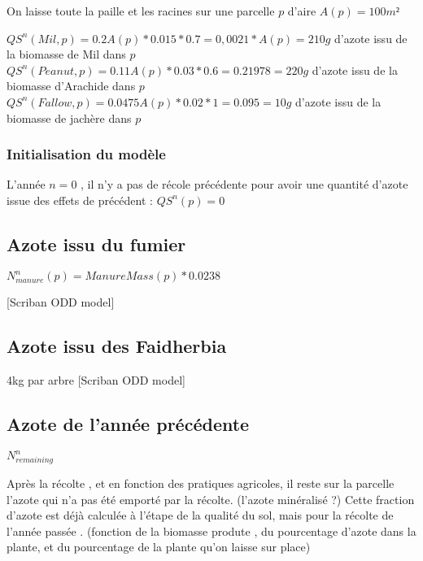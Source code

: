 \documentclass[10pt,a4paper,french]{article} %
\begin{document}
On laisse toute la paille et les racines sur une parcelle $p$ d'aire $A(p)=100m²$


$QS^{n}(Mil, p)= 0.2 A(p)* 0.015 * 0.7 = 0,0021* A(p)= 210g$ d'azote issu de la biomasse de Mil dans $p$ \\
$QS^{n}(Peanut, p)= 0.11 A(p) * 0.03 * 0.6 = 0.21978 = 220g$ d'azote issu de la biomasse d'Arachide  dans $p$\\
$QS^{n}(Fallow, p)= 0.0475 A(p)* 0.02 * 1 = 0.095 = 10g$ d'azote issu de la biomasse de jachère  dans $p$ \\




\subsubsection{Initialisation du modèle}


L'année $n=0$ , il n'y a pas de récole précédente pour  avoir une quantité d'azote issue des effets de précédent : $QS^n(p)=0$


\begin{tcolorbox}[noparskip,
    colback=LightGreen,colframe=DarkGreen,%
    colbacklower=LimeGreen!75!LightGreen,%
    title=Question]


\end{tcolorbox}






\subsection{Azote issu du fumier}



$N_{manure}^n(p)= ManureMass(p) * 0.0238$


[Scriban ODD model]




\subsection{Azote issu des Faidherbia}


4kg par arbre [Scriban ODD model]


\subsection{Azote de l'année précédente}



$N_{remaining}^n$


Après la récolte , et en fonction des pratiques agricoles, il reste sur la parcelle l'azote qui n'a pas été emporté par la récolte. (l'azote minéralisé ?)
Cette fraction d'azote est déjà calculée à l'étape de la qualité du sol, mais pour la récolte de l'année passée . (fonction de la biomasse produte , du pourcentage d'azote dans la plante, et du pourcentage de la plante qu'on laisse sur place) 
\end{document}
